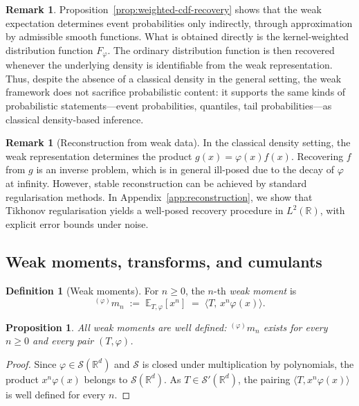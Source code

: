 \documentclass[12pt]{article}
\newtheorem{proposition}[theorem]{Proposition}
\theoremstyle{definition}
\newtheorem{definition}[theorem]{Definition}
\newtheorem{remark}[theorem]{Remark}
\newcommand{\R}{\mathbb{R}}
\newcommand{\E}{\mathbb{E}}
\begin{document}
\begin{remark}\label{rem:probability-recovery}
Proposition~\ref{prop:weighted-cdf-recovery} shows that the weak expectation
determines event probabilities only indirectly, through approximation by
admissible smooth functions. What is obtained directly is the
kernel-weighted distribution function $F_{\varphi}$. The ordinary
distribution function is then recovered whenever the underlying density is
identifiable from the weak representation.  Thus, despite the absence of a classical density in the general setting, the weak framework does not sacrifice probabilistic content: it supports the same kinds of probabilistic statements---event probabilities, quantiles, tail probabilities---as classical density-based inference.
\end{remark}

\begin{remark}[Reconstruction from weak data]
\label{rem:reconstruction}
In the classical density setting, the weak representation determines the
product $g(x)=\varphi(x)f(x)$. Recovering $f$ from $g$ is an inverse problem,
which is in general ill-posed due to the decay of $\varphi$ at infinity.
However, stable reconstruction can be achieved by standard regularisation
methods. In Appendix~\ref{app:reconstruction}, we show that Tikhonov
regularisation yields a well-posed recovery procedure in $L^2(\R)$, with
explicit error bounds under noise.
\end{remark}

\subsection{Weak moments, transforms, and cumulants}
\label{subsec:preliminaries_moments}

\begin{definition}[Weak moments]\label{def:weak-moments}
For $n\geq 0$, the $n$-th \emph{weak moment} is
\[
{}^{(\varphi)}m_n \;:=\; \E_{T,\varphi}[x^n] \;=\; \langle T,\,x^n\varphi(x)\rangle.
\]
\end{definition}

\begin{proposition}\label{prop:moments-exist}
All weak moments are well defined: ${}^{(\varphi)}m_n$ exists for every $n\geq 0$ and every pair $(T,\varphi)$.
\end{proposition}

\begin{proof}
Since $\varphi \in \mathcal{S}(\R^d)$ and $\mathcal{S}$ is closed under multiplication by polynomials, the product $x^n\varphi(x)$ belongs to $\mathcal{S}(\R^d)$.  As $T \in \mathcal{S}'(\R^d)$, the pairing $\langle T, x^n\varphi(x)\rangle$ is well defined for every $n$.
\end{proof}
\end{document}

